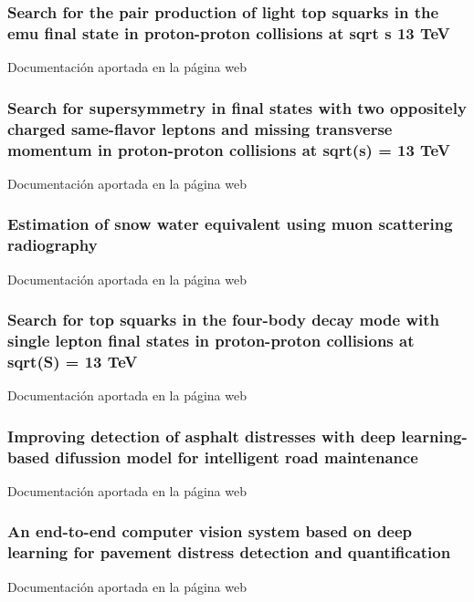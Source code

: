 \documentclass[a4paper, 11pt, twoside, openright]{report}
\begin{document}
\subsubsection{Search for the pair production of light top squarks in the emu final state in proton-proton collisions at sqrt s 13 TeV}
Documentación aportada en la página web
%
\subsubsection{Search for supersymmetry in final states with two oppositely charged same-flavor leptons and missing transverse momentum in proton-proton collisions at sqrt(s) = 13 TeV}
Documentación aportada en la página web
%
\subsubsection{Estimation of snow water equivalent using muon scattering radiography}
Documentación aportada en la página web
%
\subsubsection{Search for top squarks in the four-body decay mode with single lepton final states in proton-proton collisions at sqrt(S) = 13 TeV}
Documentación aportada en la página web
%
\subsubsection{Improving detection of asphalt distresses with deep learning-based difussion model for intelligent road maintenance}
Documentación aportada en la página web
%
\subsubsection{An end-to-end computer vision system based on deep learning for pavement distress detection and quantification}
Documentación aportada en la página web
%
\end{document}
